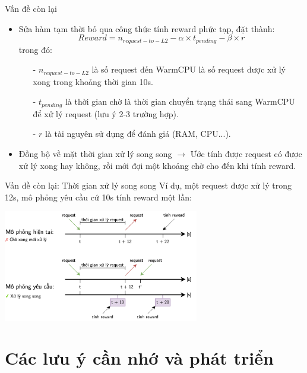 \documentclass[10pt,aspectratio=169]{beamer}
\begin{document}
\begin{frame}{Vấn đề còn lại}{\secname}
\begin{itemize}
\setlength\itemsep{8pt}
\item Sửa hàm  tạm thời bỏ qua công thức tính reward phức tạp, đặt thành:
\begin{equation*}
Reward = n_{request-to-L2} - \alpha \times t_{pending} - \beta \times r
\end{equation*}
trong đó:
\begin{itemize}
\setlength\itemsep{4pt}
\item[-] $ n_{request-to-L2} $ là số request đến WarmCPU là số request được xử lý xong trong khoảng thời gian 10s.
\item[-] $ t_{pending} $ là thời gian chờ là thời gian chuyển trạng thái sang WarmCPU để xử lý request (lưu ý 2-3 trường hợp).
\item[-] $ r $ là tài nguyên sử dụng để đánh giá (RAM, CPU...).
\end{itemize}
\item Đồng bộ về mặt thời gian xử lý song song $ \rightarrow $ Ước tính được request có được xử lý xong hay không, rồi mới đợi một khoảng chờ cho đến khi tính reward.
\end{itemize}
\end{frame}

\begin{frame}{Vấn đề còn lại: Thời gian xử lý song song}{\secname}
Ví dụ, một request được xử lý trong 12s, mô phỏng yêu cầu cứ 10s tính reward một lần:
\begin{center}
\includegraphics[width=0.64\textwidth]{source/1.png}\\
\end{center}
\end{frame}

\section{Các lưu ý cần nhớ và phát triển}
\end{document}
